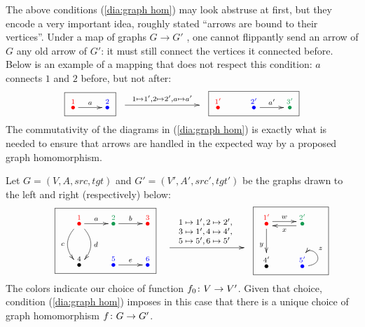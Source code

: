 \documentclass[CT4S-EN-RU]{subfiles}
\begin{document}
\begin{definitionRUS}\label{def:graph homomorphism}
\end{definitionRUS}

\begin{remarkENG}
The above conditions (\ref{dia:graph hom}) may look abstruse at first, but they encode a very important idea, roughly stated “arrows are bound to their vertices”. Under a map of graphs $G\to G'$ , one cannot flippantly send an arrow of $G$ any old arrow of $G'$: it must still connect the vertices it connected before. Below is an example of a mapping that does not respect this condition: $a$ connects $1$ and $2$ before, but not after:
$$
\fbox{\xymatrix{\LMO{\color{red}{1}}\ar[r]^{a}&\LMO{\color{blue}{2}}}}
\xymatrix{~\ar[rr]^{1\mapsto 1',2\mapsto 2', a\mapsto a'}&\hsp&~}
\fbox{\xymatrix{\LMO{\color{red}{1'}}&\LMO{\color{blue}{2'}}\ar[r]^{a'}&\LMO{\color{ForestGreen}{3'}}}}
$$
The commutativity of the diagrams in (\ref{dia:graph hom}) is exactly what is needed to ensure that arrows are handled in the expected way by a proposed graph homomorphism.
\end{remarkENG}

\begin{remarkRUS}
\end{remarkRUS}

\begin{exampleENG}\label{ex:graph hom}
Let $G=(V,A,src,tgt)$ and $G'=(V',A',src',tgt')$ be the graphs drawn to the left and right (respectively) below:
\begin{align}\label{dia:graph hom example}
\parbox{1.5in}{\fbox{\xymatrix{\LMO{\color{red}{1}}\ar[r]^a\ar@/^1pc/[d]^d\ar@/_1pc/[d]_c&\LMO{\color{ForestGreen}{2}}\ar[r]^b&\LMO{\color{red}{3}}\\\LMO{4}&\LMO{\color{blue}{5}}\ar[r]^e&\LMO{\color{blue}{6}}}}}
\parbox{1in}{\xymatrix{~\ar[rr]^{\parbox{.8in}{\vspace{-.2in}\footnotesize$1\mapsto 1', 2\mapsto 2',\\ 3\mapsto 1',4\mapsto 4',\\ 5\mapsto 5',6\mapsto5'$}}&\hsp&~}}
\parbox{.8in}{\fbox{\xymatrix{\LMO{\color{red}{1'}}\ar@<.5ex>[r]^w\ar[d]_y&\LMO{\color{ForestGreen}{2'}}\ar@<.5ex>[l]^x\\\LMO{4'}&\LMO{\color{blue}{5'}}\ar@(r,u)[]_z}}}
\end{align}
The colors indicate our choice of function $f_0\colon V\rightarrow V'$. Given that choice, condition (\ref{dia:graph hom}) imposes in this case that there is a unique choice of graph homomorphism $f\colon G\rightarrow G'$. 
\end{exampleENG}
\end{document}
